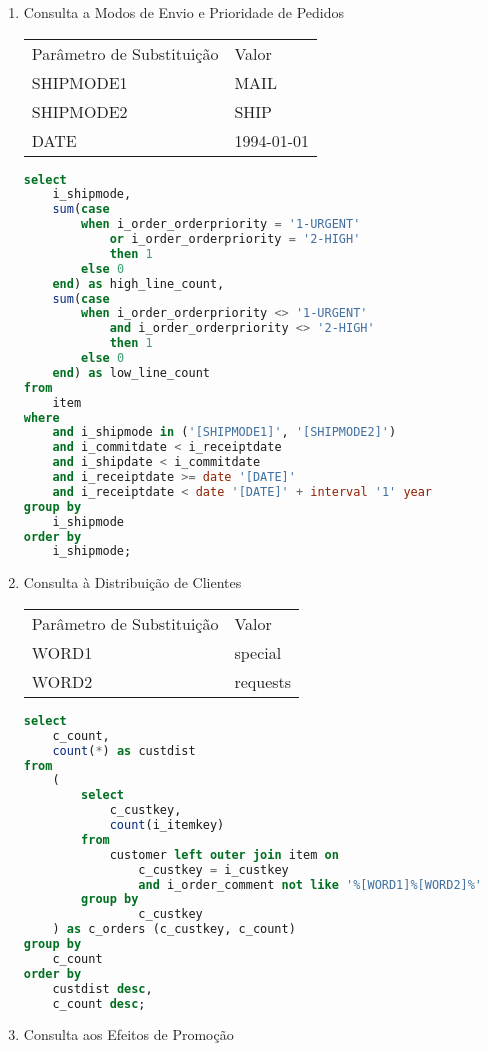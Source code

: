 \begin{enumerate}
\item Consulta a Modos de Envio e Prioridade de Pedidos

\begin{tabular}{ll}
	Parâmetro de Substituição & Valor\\
	SHIPMODE1 & MAIL\\
	SHIPMODE2 & SHIP\\
	DATE & 1994-01-01 \\
\end{tabular}

	\begin{lstlisting}[language=SQL]
select
	i_shipmode,
	sum(case
		when i_order_orderpriority = '1-URGENT'
			or i_order_orderpriority = '2-HIGH'
			then 1
		else 0
	end) as high_line_count,
	sum(case
		when i_order_orderpriority <> '1-URGENT'
			and i_order_orderpriority <> '2-HIGH'
			then 1
		else 0
	end) as low_line_count
from
	item
where
	and i_shipmode in ('[SHIPMODE1]', '[SHIPMODE2]')
	and i_commitdate < i_receiptdate
	and i_shipdate < i_commitdate
	and i_receiptdate >= date '[DATE]'
	and i_receiptdate < date '[DATE]' + interval '1' year
group by
	i_shipmode
order by
	i_shipmode;
	\end{lstlisting}
	
\item Consulta à Distribuição de Clientes

\begin{tabular}{ll}
	Parâmetro de Substituição & Valor\\
	WORD1 & special\\
	WORD2 & requests\\
\end{tabular}

	\begin{lstlisting}[language=SQL]
select
    c_count,
    count(*) as custdist
from
    (
        select
            c_custkey,
            count(i_itemkey)
        from
            customer left outer join item on
                c_custkey = i_custkey
                and i_order_comment not like '%[WORD1]%[WORD2]%'
        group by
                c_custkey
    ) as c_orders (c_custkey, c_count)
group by
    c_count
order by
    custdist desc,
    c_count desc;
	\end{lstlisting}

\item Consulta aos Efeitos de Promoção


\end{enumerate}
